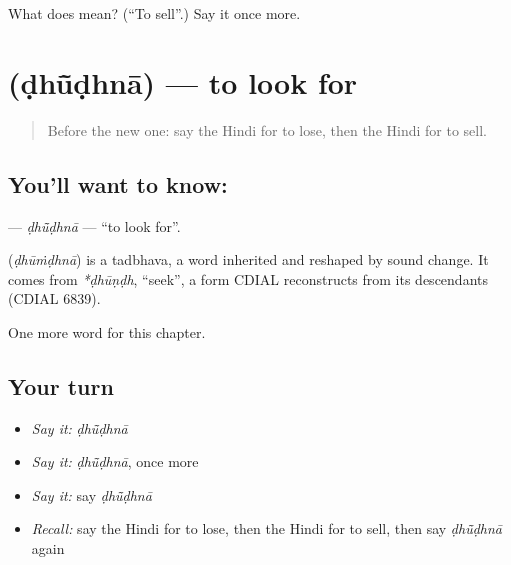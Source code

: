 \begin{tcolorbox}[breakable,colback=teal!4,colframe=teal!35!black,title={Before you move on}]
What does  mean? (\textquotedblleft{}To sell\textquotedblright{}.) Say it once more.
\end{tcolorbox}
\section[\texorpdfstring{\hi{ढूँढना} (ḍhū̃ḍhnā)}{ढूँढना (ḍhū̃ḍhnā)}]{ (ḍhū̃ḍhnā) — to look for}

\label{lesson:HI-C163-dhudhna}



\begin{quote}
Before the new one: say the Hindi for to lose, then the Hindi for to sell.
\end{quote}

\subsection*{You'll want to know: }
\textbf{} — \emph{ḍhū̃ḍhnā} — \textquotedblleft{}to look for\textquotedblright{}.

\begin{cousinweb}
\textbf{} (\emph{ḍhūṁḍhnā}) is a tadbhava, a word inherited and reshaped by sound change. It comes from \emph{*ḍhūṇḍh}, \textquotedblleft{}seek\textquotedblright{}, a form CDIAL reconstructs from its descendants (CDIAL 6839).
\end{cousinweb}

\begin{grammarlens}[title={What you've built}]
One more word for this chapter.
\end{grammarlens}

\subsection*{Your turn}
\begin{itemize}
\raggedright
  \item \emph{Say it:} \emph{ḍhū̃ḍhnā}
  \item \emph{Say it:} \emph{ḍhū̃ḍhnā}, once more
  \item \emph{Say it:} say \emph{ḍhū̃ḍhnā}
  \item \emph{Recall:} say the Hindi for to lose, then the Hindi for to sell, then say \emph{ḍhū̃ḍhnā} again
\end{itemize}

